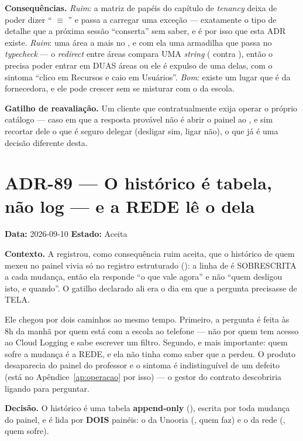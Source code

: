 \textbf{Consequências.} \emph{Ruim}: a matriz de papéis do capítulo de
\emph{tenancy} deixa de poder dizer \enquote{ $\equiv$
} e passa a carregar uma exceção --- exatamente o tipo de
detalhe que a próxima sessão \enquote{conserta} sem saber, e é por isso que esta
ADR existe. \emph{Ruim}: uma área a mais no , e com ela uma
armadilha que passa no \emph{typecheck} --- o \emph{redirect} entre áreas compara
UMA \emph{string} ( contra ), então o
 precisa poder entrar em DUAS áreas ou ele é expulso de uma delas, com
o sintoma \enquote{clico em Recursos e caio em Usuários}. \emph{Bom}: existe um
lugar que é da fornecedora, e ele pode crescer sem se misturar com o da escola.

\textbf{Gatilho de reavaliação.} Um cliente que contratualmente exija operar o
próprio catálogo --- caso em que a resposta provável não é abrir o painel ao
, e sim recortar dele o que é seguro delegar (desligar sim,
ligar não), o que já é uma decisão diferente desta.

\section{ADR-89 --- O histórico é tabela, não log --- e a REDE lê o dela}

\textbf{Data:} 2026-09-10 \quad \textbf{Estado:} Aceita

\textbf{Contexto.} A  registrou, como consequência ruim aceita, que
o histórico de quem mexeu no painel vivia só no registro estruturado
(): a linha de  é
SOBRESCRITA a cada mudança, então ela responde \enquote{o que vale agora} e não
\enquote{quem desligou isto, e quando}. O gatilho declarado ali era o dia em que
a pergunta precisasse de TELA.

Ele chegou por dois caminhos ao mesmo tempo. Primeiro, a pergunta é feita às 8h
da manhã por quem está com a escola ao telefone --- não por quem tem acesso ao
Cloud Logging e sabe escrever um filtro. Segundo, e mais importante: quem sofre
a mudança é a REDE, e ela não tinha como saber que a perdeu. O produto
desaparecia do painel do professor e o sintoma é indistinguível de um defeito
(está no Apêndice~\ref{ap:operacao} por isso) --- o gestor do contrato
descobriria ligando para perguntar.

\textbf{Decisão.} O histórico é uma tabela \textbf{append-only}
(), escrita por toda mudança do painel, e é lida por
\textbf{DOIS} painéis: o da Unooria (, quem faz) e o da
rede (, quem sofre).

